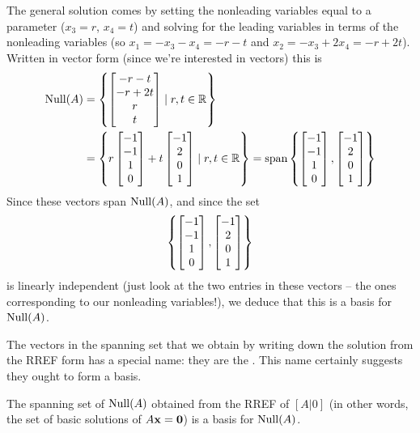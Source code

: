 \begin{myprob}
\begin{mysol}
The general solution comes by setting the nonleading variables equal to 
a parameter ($x_3 = r$, $x_4=t$) and solving for the leading variables in terms of
the nonleading variables (so $x_1 = -x_3-x_4 = -r-t$ and $x_2 = -x_3+2x_4 = -r+2t$).
Written in vector form (since we're interested in
vectors) this is
\begin{align*}
\operatorname{Null}(A) &= \left\{ \left[ \begin{matrix} -r-t\\-r+2t\\r\\t \end{matrix} \right] \mid r,t\in \mathbb{R}\right\}\\
&=  \left\{ r\left[ \begin{matrix} -1\\-1\\1\\0 \end{matrix} \right]+t\left[ \begin{matrix} -1\\2\\0\\1 \end{matrix} \right] \mid r,t\in \mathbb{R}\right\}
= \textrm{span}\left\{ \left[ \begin{matrix} -1\\-1\\1\\0 \end{matrix} \right], \left[ \begin{matrix} -1\\2\\0\\1 \end{matrix} \right] \right\}
\end{align*}
Since these vectors span $\operatorname{Null}(A)$, and since the set
$$
\left\{ \left[ \begin{matrix} -1\\-1\\1\\0 \end{matrix} \right], \left[ \begin{matrix} -1\\2\\0\\1 \end{matrix} \right] \right\}
$$
is linearly independent (just look at the two entries in these  vectors -- the ones corresponding to 
our nonleading variables!), we deduce
that this is a basis for $\operatorname{Null}(A)$.
\end{mysol}\end{myprob}

The vectors in the spanning set that we obtain by writing down the solution from the
RREF form has a special name:  they are the .  This name certainly suggests they ought to form a basis.

\begin{theorem} \label{kernelbasis}

The spanning set of $\operatorname{Null}(A)$ obtained from the RREF   of $[A|0]$ (in other words, the set of basic solutions of $A\mathbf{x}=\mathbf{0}$) is a basis
for $\operatorname{Null}(A)$.
\end{theorem}

